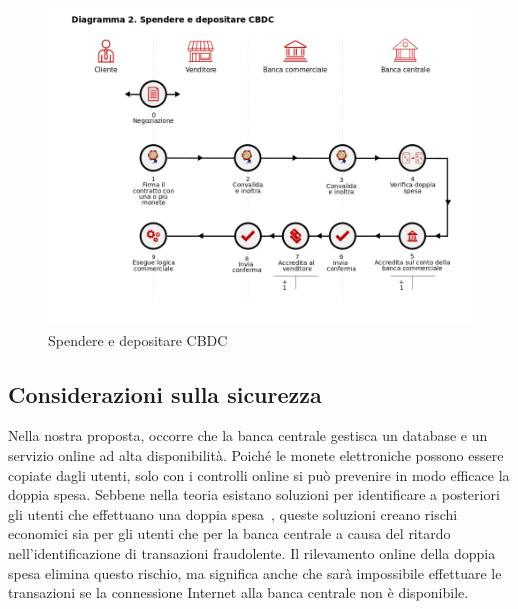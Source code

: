 \documentclass{article}
\begin{document}
\begin{figure}[h!]
  \includegraphics[width=\textwidth]{diagramma2-it.png}
  \caption{Spendere e depositare CBDC}
  \label{fig:fig2}
\end{figure}

\hypertarget{considerazioni-sulla-sicurezza}{%
\subsection{Considerazioni sulla sicurezza}
\label{considerazioni-sulla-sicurezza}}

Nella nostra proposta, occorre che la banca centrale gestisca un 
database e un servizio online ad alta disponibilità. Poiché le monete 
elettroniche possono essere copiate dagli utenti, solo con i controlli 
online si può prevenire in modo efficace la doppia spesa. Sebbene 
nella teoria esistano soluzioni per identificare a posteriori gli 
utenti che effettuano una doppia spesa~\cite[vedi][]{Chaum1990}, 
queste soluzioni creano rischi economici sia per gli utenti che per la 
banca centrale a causa del ritardo nell'identificazione di 
transazioni fraudolente. Il rilevamento online della doppia spesa 
elimina questo rischio, ma significa anche che sarà impossibile 
effettuare le transazioni se la connessione Internet alla banca 
centrale non è disponibile.
\end{document}
